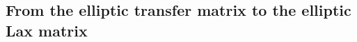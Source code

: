 \documentclass[11pt]{report}
\newtheorem{prop}[theorem]{Proposition}
\theoremstyle{definition}
\newtheorem{definition}[theorem]{Definition}
\theoremstyle{remark}
\theoremstyle{remark}
\newcommand{\C}{\mathbb{C}}
\begin{document}
\subsection{From the elliptic transfer matrix to the elliptic Lax matrix}
%
%
%
%
\end{document}

